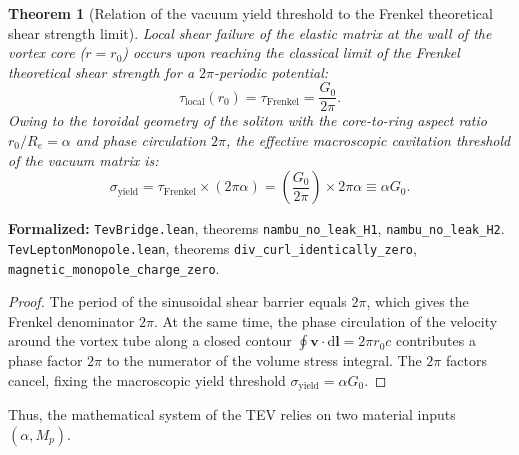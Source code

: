 \documentclass[11pt,a4paper]{article}
\newtheorem{theorem}{Theorem}
\theoremstyle{definition}
\theoremstyle{remark}
\begin{document}
\begin{theorem}[Relation of the vacuum yield threshold to the Frenkel theoretical shear strength limit]
\label{thm:frenkel_to_mises_exact}
Local shear failure of the elastic matrix at the wall of the vortex core ($r = r_0$) occurs upon reaching the classical limit of the Frenkel theoretical shear strength for a $2\pi$-periodic potential:
\begin{equation}
    \tau_{\mathrm{local}}(r_0) = \tau_{\mathrm{Frenkel}} = \frac{G_0}{2\pi}.
    \label{eq:frenkel_local_limit}
\end{equation}
Owing to the toroidal geometry of the soliton with the core-to-ring aspect ratio $r_0 / R_e = \alpha$ and phase circulation $2\pi$, the effective macroscopic cavitation threshold of the vacuum matrix is:
\begin{equation}
    \sigma_{\mathrm{yield}} = \tau_{\mathrm{Frenkel}} \times (2\pi \alpha) = \left(\frac{G_0}{2\pi}\right) \times 2\pi \alpha \equiv \alpha G_0.
    \label{eq:frenkel_cancellation_exact}
\end{equation}
\end{theorem}

\noindent\small\textbf{Formalized:} \texttt{TevBridge.lean}, theorems \texttt{nambu_no_leak_H1}, \texttt{nambu_no_leak_H2}. \texttt{TevLeptonMonopole.lean}, theorems \texttt{div_curl_identically_zero}, \texttt{magnetic_monopole_charge_zero}.

\begin{proof}
The period of the sinusoidal shear barrier equals $2\pi$, which gives the Frenkel denominator $2\pi$. At the same time, the phase circulation of the velocity around the vortex tube along a closed contour $\oint \mathbf{v} \cdot \mathrm{d}\mathbf{l} = 2\pi r_0 c$ contributes a phase factor $2\pi$ to the numerator of the volume stress integral. The $2\pi$ factors cancel, fixing the macroscopic yield threshold $\sigma_{\mathrm{yield}} = \alpha G_0$.
\end{proof}
Thus, the mathematical system of the TEV relies on two material inputs $(\alpha, M_p)$.
\end{document}
